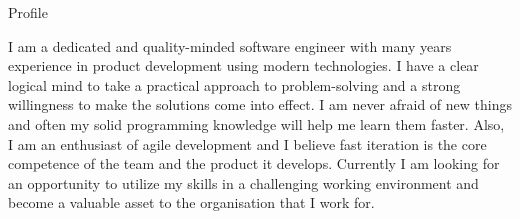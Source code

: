\documentclass[print]{mcdowellcv}
\begin{document}
	\makeheader
	
	\begin{cvsection}{Profile}
		\begin{cvsubsection}{}{}{}	
		I am a dedicated and quality-minded software engineer with many years experience in product development using modern technologies. I have a clear logical mind to take a practical approach to problem-solving and a strong willingness to make the solutions come into effect. I am never afraid of new things and often my solid programming knowledge will help me learn them faster. Also, I am an enthusiast of agile development and I believe fast iteration is the core competence of the team and the product it develops. Currently I am looking for an opportunity to utilize my skills in a challenging working environment and become a valuable asset to the organisation that I work for.
		\end{cvsubsection}	
	\end{cvsection}
\end{document}
